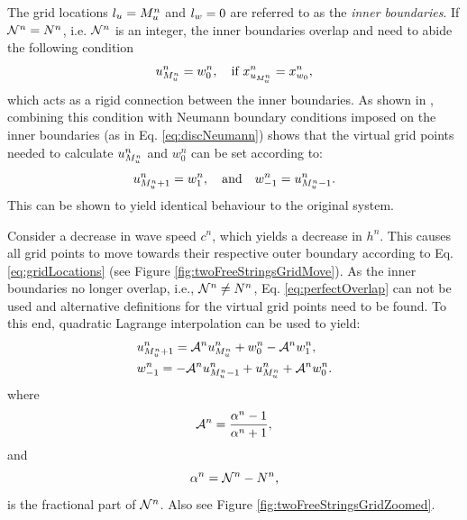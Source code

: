 \documentclass[fleqn]{jaes}
\begin{document}
The grid locations ${l_u} = M_u^n$ and ${l_w} = 0$ are referred to as the \textit{inner boundaries}. If $\mathcal{N}^n = N^n$, i.e. $\mathcal{N}^n$ is an integer, the inner boundaries overlap and need to abide the following condition
\begin{equation}\label{eq:rigid}
    u_{\Mu}^n = w_0^n, \quad \text{if}\  x_{u_{\Mu}}^n =  x_{w_0}^n,
\end{equation}
which acts as a rigid connection between the inner boundaries. As shown in
\cite{Willemsen2021a}, combining this condition with Neumann boundary conditions imposed on the inner boundaries (as in Eq. \eqref{eq:discNeumann}) shows that the virtual grid points needed to calculate $u_{M_u^n}^n$ and $w_0^n$ can be set according to:
\begin{equation}\label{eq:perfectOverlap}
    u_{\Mu+1}^n = w_1^n, \qaq w_{-1}^n = u_{\Mu-1}^n.
\end{equation}
This can be shown to yield identical behaviour to the original system.

Consider a decrease in wave speed $c^n$, which yields a decrease in $h^n$. This causes all grid points to move towards their respective outer boundary according to Eq. \eqref{eq:gridLocations} (see Figure \ref{fig:twoFreeStringsGridMove}). As the inner boundaries no longer overlap, i.e., $\mathcal{N}^n \neq N^n$, Eq. \ref{eq:perfectOverlap} can not be used and alternative definitions for the virtual grid points need to be found. To this end, quadratic Lagrange interpolation can be used to yield:
\begin{subequations}\label{eq:connectionInterpol}
    \begin{align}
            &u_{\Mu+1}^n = \Aterm u_{\Mu}^n + w_0^n - \Aterm w_1^n,
        \label{eq:calcUMP1}\\
            &w_{-1}^n = -\Aterm u_{\Mu-1}^n + u_{\Mu}^n+\Aterm w_{0}^n.\label{eq:calcWM1}
    \end{align}
\end{subequations}
where
\begin{equation}
    \mathcal{A}^n = \frac{\alpha^n-1}{\alpha^n+1},
\end{equation}
and 
\begin{equation}\label{eq:alphaDef}
    \alpha^n = \Nfrac^n - N^n,
\end{equation}
is the fractional part of $\mathcal{N}^n$. Also see Figure \ref{fig:twoFreeStringsGridZoomed}.
\end{document}
